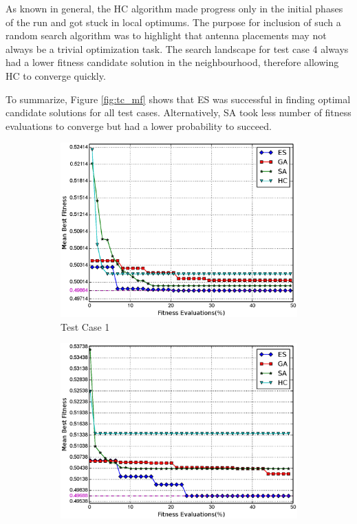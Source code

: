 \documentclass[conference]{IEEEtran}
\begin{document}
As known in general, the HC algorithm made progress only in the initial phases of the run and got stuck in local optimums. The purpose for inclusion of such a random search algorithm was to highlight that antenna placements may not always be a trivial optimization task. The search landscape for test case 4 always had a lower fitness candidate solution in the neighbourhood, therefore allowing HC to converge quickly.

To summarize, Figure \ref{fig:tc_mf} shows that ES was successful in finding optimal candidate solutions for all test cases. Alternatively, SA took less number of fitness evaluations to converge but had a lower probability to succeed.
\begin{figure}
    \centering
    \begin{subfigure}{\columnwidth}
        \includegraphics[width=\columnwidth]{FIG/tc1_mf.eps}%
        \caption{Test Case 1}%
    \label{fig:tc1_mf}%
    \end{subfigure}\hfill%
    \begin{subfigure}{\columnwidth}
        \includegraphics[width=\columnwidth]{FIG/tc2_mf.eps}%

\end{subfigure}
\end{figure}
\end{document}
